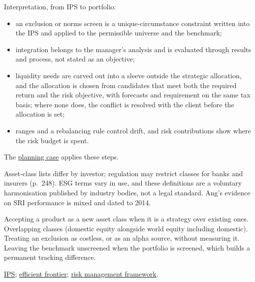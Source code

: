 \begin{qfmethod}
 Interpretation, from IPS to portfolio:
\begin{itemize}
\item an exclusion or norms screen is a unique-circumstance constraint written into the IPS and applied to the permissible universe and the benchmark;
\item integration belongs to the manager's analysis and is evaluated through results and process, not stated as an objective;
\item liquidity needs are carved out into a sleeve outside the strategic allocation, and the allocation is chosen from candidates that meet both the required return and the risk objective, with forecasts and requirement on the same tax basis; where none does, the conflict is resolved with the client before the allocation is set;
\item ranges and a rebalancing rule control drift, and risk contributions show where the risk budget is spent.
\end{itemize}
The \hyperref[ex:investment-planning-case]{planning case} applies these steps.

 Asset-class lists differ by investor; regulation may restrict classes for banks and insurers (p.~248). ESG terms vary in use, and these definitions are a voluntary harmonisation published by industry bodies, not a legal standard. Ang's evidence on SRI performance is mixed and dated to 2014.

 Accepting a product as a new asset class when it is a strategy over existing ones. Overlapping classes (domestic equity alongside world equity including domestic). Treating an exclusion as costless, or as an alpha source, without measuring it. Leaving the benchmark unscreened when the portfolio is screened, which builds a permanent tracking difference.

 \hyperref[meth:investment-policy-statement]{IPS}; \hyperref[meth:efficient-frontier]{efficient frontier}; \hyperref[def:risk-management-framework]{risk management framework}.

\end{qfmethod}

